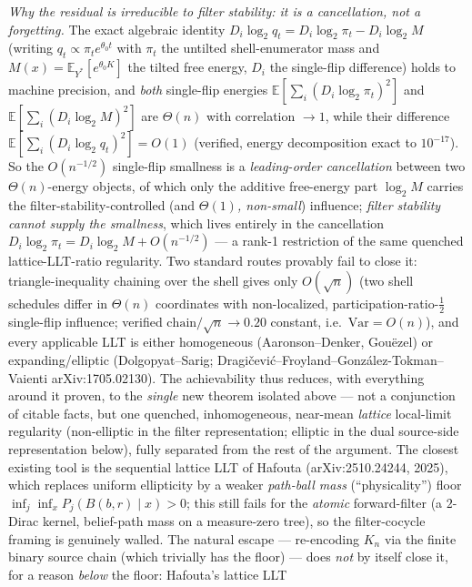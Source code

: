 \documentclass[
]{article}
\begin{document}
\emph{Why the residual is irreducible to filter stability: it is a cancellation, not a forgetting.} The
exact algebraic identity $D_i\log_2 q_t=D_i\log_2\pi_t-D_i\log_2 M$ (writing $q_t\propto\pi_t e^{\theta_0
t}$ with $\pi_t$ the untilted shell-enumerator mass and $M(x)=\mathbb E_{Y^{*}}[e^{\theta_0 K}]$ the
tilted free energy, $D_i$ the single-flip difference) holds to machine precision, and \emph{both}
single-flip energies $\mathbb E[\sum_i(D_i\log_2\pi_t)^2]$ and $\mathbb E[\sum_i(D_i\log_2 M)^2]$ are
$\Theta(n)$ with correlation $\to1$, while their difference $\mathbb E[\sum_i(D_i\log_2 q_t)^2]=O(1)$
(verified, energy decomposition exact to $10^{-17}$). So the $O(n^{-1/2})$ single-flip smallness is a
\emph{leading-order cancellation} between two $\Theta(n)$-energy objects, of which only the additive
free-energy part $\log_2 M$ carries the filter-stability-controlled (and \emph{$\Theta(1)$, non-small})
influence; \emph{filter stability cannot supply the smallness}, which lives entirely in the cancellation
$D_i\log_2\pi_t=D_i\log_2 M+O(n^{-1/2})$ --- a rank-1 restriction of the same quenched lattice-LLT-ratio
regularity. Two standard routes provably fail to close it: triangle-inequality chaining over the shell
gives only $O(\sqrt n)$ (two shell schedules differ in $\Theta(n)$ coordinates with non-localized,
participation-ratio-$\tfrac12$ single-flip influence; verified $\mathrm{chain}/\sqrt n\to0.20$ constant,
i.e.\ $\mathrm{Var}=O(n)$), and every applicable LLT is either homogeneous (Aaronson--Denker,
Gou\"ezel) or expanding/elliptic (Dolgopyat--Sarig; Dragi\v cevi\'c--Froyland--Gonz\'alez-Tokman--Vaienti
arXiv:1705.02130). The achievability thus reduces, with everything around it proven, to the
\emph{single} new theorem isolated above --- not a conjunction of citable facts, but one quenched,
inhomogeneous, near-mean \emph{lattice} local-limit regularity (non-elliptic in the filter
representation; elliptic in the dual source-side representation below), fully separated from the
rest of the argument. The closest existing tool is the sequential lattice LLT of Hafouta
(arXiv:2510.24244, 2025), which replaces uniform ellipticity by a weaker \emph{path-ball mass}
(``physicality'') floor $\inf_{j}\inf_x P_{j}(B(b,r)\mid x)>0$; this still fails for the
\emph{atomic} forward-filter (a $2$-Dirac kernel, belief-path mass on a measure-zero tree), so the
filter-cocycle framing is genuinely walled. The natural escape --- re-encoding $K_n$ via the finite binary source chain (which trivially has the
floor) --- does \emph{not} by itself close it, for a reason \emph{below} the floor: Hafouta's lattice LLT
\end{document}
